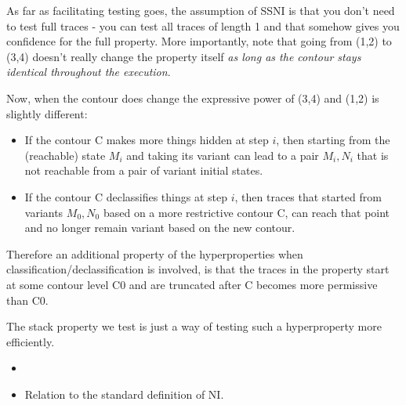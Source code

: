 \documentclass[conference]{IEEEtran}
\begin{document}
As far as facilitating testing goes, the assumption of SSNI is that
you don't need to test full traces - you can test all traces of length
1 and that somehow gives you confidence for the full property.
%
More importantly, note that going from (1,2) to (3,4) doesn't really
change the property itself {\em as long as the contour stays identical
  throughout the execution}.

Now, when the contour does change the expressive power of (3,4) and (1,2)
is slightly different:
\begin{itemize}
\item If the contour C makes more things hidden at step $i$, then
  starting from the (reachable) state $M_i$ and taking its variant can
  lead to a pair $M_i, N_i$ that is not reachable from a pair of variant
  initial states.
\item If the contour C declassifies things at step $i$, then traces
  that started from variants $M_0, N_0$ based on a more restrictive
  contour C, can reach that point and no longer remain variant based
  on the new contour.
\end{itemize}
Therefore an additional property of the hyperproperties when
classification/declassification is involved, is that the traces
in the property start at some contour level C0 and are truncated
after C becomes more permissive than C0.

The stack property we test is just a way of testing such a
hyperproperty more efficiently.





\iftext
\begin{itemize}
\item {}

\item Relation to the standard definition of NI.
\end{itemize}
\fi
\end{document}
